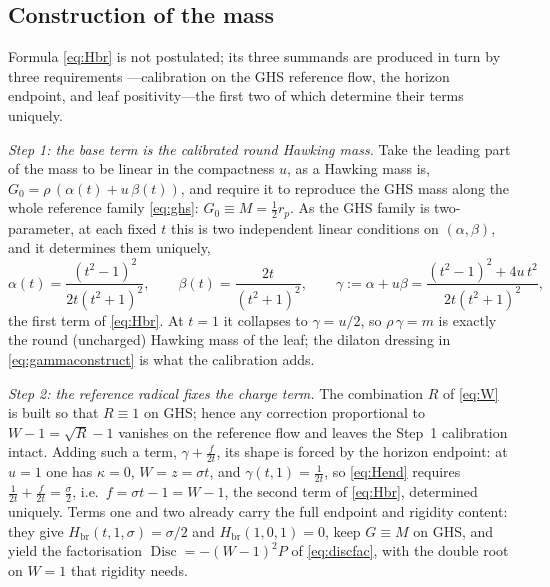 \documentclass[11pt]{article}
\theoremstyle{plain}
\theoremstyle{definition}
\newcommand{\Hbr}{H_{\mathrm{br}}}
\newcommand{\Disc}{\operatorname{Disc}}
\begin{document}
\subsection{Construction of the mass}\label{sec:massconstruct}

Formula \eqref{eq:Hbr} is not postulated; its three summands are produced in turn by three requirements
---calibration on the GHS reference flow, the horizon endpoint, and leaf positivity---the first two of which
determine their terms uniquely.

\emph{Step 1: the base term is the calibrated round Hawking mass.} Take the leading part of the mass to be
linear in the compactness $u$, as a Hawking mass is, $G_0=\rho\,(\alpha(t)+u\,\beta(t))$, and require it to
reproduce the GHS mass along the whole reference family \eqref{eq:ghs}: $G_0\equiv M=\tfrac12 r_p$. As the
GHS family is two-parameter, at each fixed $t$ this is two independent linear conditions on $(\alpha,\beta)$,
and it determines them uniquely,
\begin{equation}\label{eq:gammaconstruct}
   \alpha(t)=\frac{(t^2-1)^2}{2t(t^2+1)^2},\qquad
   \beta(t)=\frac{2t}{(t^2+1)^2},\qquad
   \gamma:=\alpha+u\beta=\frac{(t^2-1)^2+4u\,t^2}{2t(t^2+1)^2},
\end{equation}
the first term of \eqref{eq:Hbr}. At $t=1$ it collapses to $\gamma=u/2$, so $\rho\,\gamma=m$ is exactly the
round (uncharged) Hawking mass of the leaf; the dilaton dressing in \eqref{eq:gammaconstruct} is what the
calibration adds.

\emph{Step 2: the reference radical fixes the charge term.} The combination $R$ of \eqref{eq:W} is built so
that $R\equiv1$ on GHS; hence any correction proportional to $W-1=\sqrt R-1$ vanishes on the reference flow
and leaves the Step~1 calibration intact. Adding such a term, $\gamma+\tfrac{f}{2t}$, its shape is forced by
the horizon endpoint: at $u=1$ one has $\kappa=0$, $W=z=\sigma t$, and $\gamma(t,1)=\tfrac1{2t}$, so
\eqref{eq:Hend} requires $\tfrac1{2t}+\tfrac{f}{2t}=\tfrac{\sigma}{2}$, i.e.\ $f=\sigma t-1=W-1$, the second
term of \eqref{eq:Hbr}, determined uniquely. Terms one and two already carry the full endpoint and rigidity
content: they give $\Hbr(t,1,\sigma)=\sigma/2$ and $\Hbr(1,0,1)=0$, keep $G\equiv M$ on GHS, and yield the
factorisation $\Disc=-(W-1)^2P$ of \eqref{eq:discfac}, with the double root on $W=1$ that rigidity needs.
\end{document}

